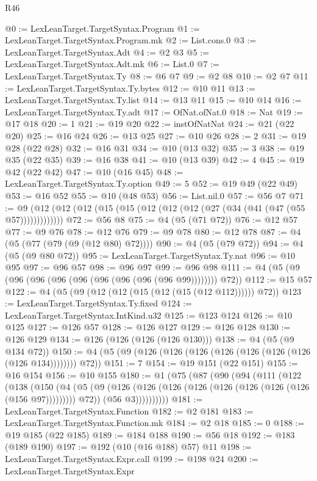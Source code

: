 \begin{lexlean}{R46}
\begin{coremodule}
@0 := LexLeanTarget.TargetSyntax.Program
@1 := LexLeanTarget.TargetSyntax.Program.mk
@2 := List.cons.{0}
@3 := LexLeanTarget.TargetSyntax.Adt
@4 := @2 @3
@5 := LexLeanTarget.TargetSyntax.Adt.mk
@6 := List.{0}
@7 := LexLeanTarget.TargetSyntax.Ty
@8 := @6 @7
@9 := @2 @8
@10 := @2 @7
@11 := LexLeanTarget.TargetSyntax.Ty.bytes
@12 := @10 @11
@13 := LexLeanTarget.TargetSyntax.Ty.list
@14 := @13 @11
@15 := @10 @14
@16 := LexLeanTarget.TargetSyntax.Ty.adt
@17 := OfNat.ofNat.{0}
@18 := Nat
@19 := @17 @18
@20 := 1
@21 := @19 @20
@22 := instOfNatNat
@24 := @21 (@22 @20)
@25 := @16 @24
@26 := @13 @25
@27 := @10 @26
@28 := 2
@31 := @19 @28 (@22 @28)
@32 := @16 @31
@34 := @10 (@13 @32)
@35 := 3
@38 := @19 @35 (@22 @35)
@39 := @16 @38
@41 := @10 (@13 @39)
@42 := 4
@45 := @19 @42 (@22 @42)
@47 := @10 (@16 @45)
@48 := LexLeanTarget.TargetSyntax.Ty.option
@49 := 5
@52 := @19 @49 (@22 @49)
@53 := @16 @52
@55 := @10 (@48 @53)
@56 := List.nil.{0}
@57 := @56 @7
@71 := @9 (@12 (@12 (@12 (@15 (@15 (@12 (@12 (@12 (@27 (@34 (@41 (@47 (@55 @57)))))))))))))
@72 := @56 @8
@75 := @4 (@5 (@71 @72))
@76 := @12 @57
@77 := @9 @76
@78 := @12 @76
@79 := @9 @78
@80 := @12 @78
@87 := @4 (@5 (@77 (@79 (@9 (@12 @80) @72))))
@90 := @4 (@5 (@79 @72))
@94 := @4 (@5 (@9 @80 @72))
@95 := LexLeanTarget.TargetSyntax.Ty.nat
@96 := @10 @95
@97 := @96 @57
@98 := @96 @97
@99 := @96 @98
@111 := @4 (@5 (@9 (@96 (@96 (@96 (@96 (@96 (@96 (@96 (@96 @99)))))))) @72))
@112 := @15 @57
@122 := @4 (@5 (@9 (@12 (@12 (@15 (@12 (@15 (@12 @112)))))) @72))
@123 := LexLeanTarget.TargetSyntax.Ty.fixed
@124 := LexLeanTarget.TargetSyntax.IntKind.u32
@125 := @123 @124
@126 := @10 @125
@127 := @126 @57
@128 := @126 @127
@129 := @126 @128
@130 := @126 @129
@134 := @126 (@126 (@126 (@126 @130)))
@138 := @4 (@5 (@9 @134 @72))
@150 := @4 (@5 (@9 (@126 (@126 (@126 (@126 (@126 (@126 (@126 (@126 @134)))))))) @72))
@151 := 7
@154 := @19 @151 (@22 @151)
@155 := @16 @154
@156 := @10 @155
@180 := @1
    (@75
      (@87
        (@90
          (@94
            (@111
              (@122
                (@138
                  (@150
                    (@4
                      (@5
                        (@9 (@126 (@126 (@126 (@126 (@126 (@126 (@126 (@126 (@156 @97))))))))) @72))
                      (@56 @3))))))))))
@181 := LexLeanTarget.TargetSyntax.Function
@182 := @2 @181
@183 := LexLeanTarget.TargetSyntax.Function.mk
@184 := @2 @18
@185 := 0
@188 := @19 @185 (@22 @185)
@189 := @184 @188
@190 := @56 @18
@192 := @183 (@189 @190)
@197 := @192 (@10 (@16 @188) @57) @11
@198 := LexLeanTarget.TargetSyntax.Expr.call
@199 := @198 @24
@200 := LexLeanTarget.TargetSyntax.Expr

\end{coremodule}
\end{lexlean}
